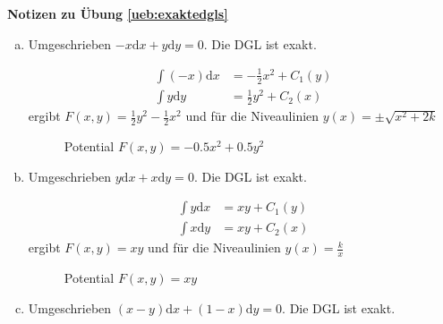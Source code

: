 \documentclass[%
11pt,%
twoside,%
titlepage,%
swissgerman,%
headsepline%
]{scrartcl}
\newcommand{\faReturnGray}{\textcolor{gray}{\faMailReply}} %
\theoremstyle{definition}
\theoremstyle{plain}
\newcommand{\concatueb}[1]{ueb:#1}%
\newcommand{\concatlsg}[1]{lsg:#1}%
\newenvironment{lsg}[1]{%
    \par\noindent\textbf{Notizen zu Übung \ref{\concatueb{#1}}}\label{\concatlsg{#1}}
    \hfill\hyperref[\concatueb{#1}]{\faReturnGray}\par %
}{%
    \par%
}
\begin{document}
\begin{lsg}{exaktedgls}
    \begin{enumerate}[a)]
        \item Umgeschrieben $-x\mathrm{d}x+y\mathrm{d}y=0$. Die DGL ist exakt.

        \begin{align*}
            \int (-x)\mathrm{d}x &= -\frac{1}{2}x^2+C_1(y)\\
            \int y\mathrm{d}y &= \frac{1}{2}y^2+C_2(x)
        \end{align*}
        ergibt $F(x,y)=\frac{1}{2}y^2-\frac{1}{2}x^2$ und für die Niveaulinien $y(x)=\pm\sqrt{x^2+2k}$

        \begin{figure}[h!]
    \centering
    \caption{Potential $F(x,y)=-0.5x^2+0.5y^2$}
\end{figure}

        \item Umgeschrieben $y\mathrm{d}x+x\mathrm{d}y=0$. Die DGL ist exakt.

        \begin{align*}
            \int y\mathrm{d}x &= xy+C_1(y)\\
            \int x\mathrm{d}y &= xy+C_2(x)
        \end{align*}
        ergibt $F(x,y)=xy$ und für die Niveaulinien $y(x)=\frac{k}{x}$

        \begin{figure}[h!]
    \centering
    \caption{Potential $F(x,y)=xy$}
    \label{fig:potxy}
\end{figure}

        \item Umgeschrieben $(x-y)\mathrm{d}x+(1-x)\mathrm{d}y=0$. Die DGL ist exakt.


\end{enumerate}
\end{lsg}
\end{document}
